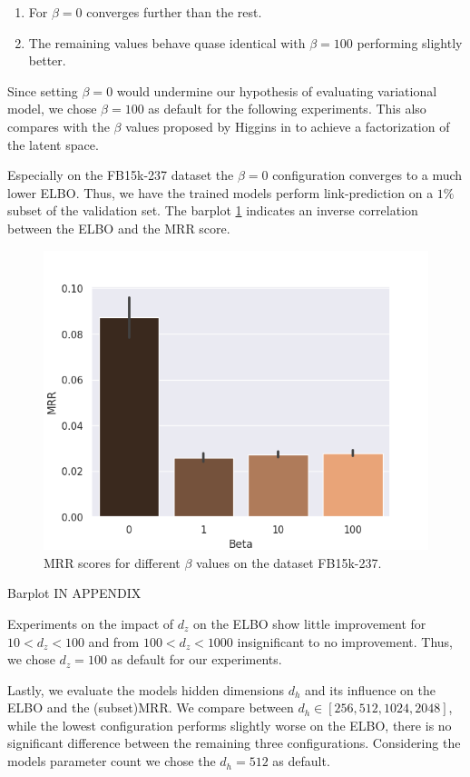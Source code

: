 \begin{enumerate}
    \item For $\beta = 0$ converges further than the rest.
    \item The remaining values behave quase identical with $\beta = 100$ performing slightly better. 
\end{enumerate}

Since setting $\beta = 0$ would undermine our hypothesis of evaluating variational model, we chose $\beta = 100$ as default for the following experiments. This also compares with the $\beta$ values proposed by Higgins in \cite{higgins_beta-vae_2016} to achieve a factorization of the latent space.

Especially on the FB15k-237 dataset the $\beta = 0$ configuration converges to a much lower ELBO. Thus, we have the trained models perform link-prediction on a $1\%$ subset of the validation set. The barplot \ref{fig5:betafbmrr} indicates an inverse correlation between the ELBO and the MRR score. 

\begin{figure}[H]
    \centering
      \includegraphics[width=.45\textwidth]{graphs/plots/beta_mrr_fb.png}
      \caption{MRR scores for different $\beta$ values on the dataset FB15k-237.}
      \label{fig5:betafbmrr}
\end{figure}

Barplot IN APPENDIX  

Experiments on the impact of $d_z$ on the ELBO show little improvement for $10<d_z<100$ and from $100<d_z<1000$ insignificant to no improvement. Thus, we chose $d_z=100$ as default for our experiments.


Lastly, we evaluate the models hidden dimensions $d_h$ and its influence on the ELBO and the (subset)MRR. We compare between $d_h\in [256, 512, 1024, 2048]$, while the lowest configuration performs slightly worse on the ELBO, there is no significant difference between the remaining three configurations. Considering the models parameter count we chose the $d_h=512$ as default.


